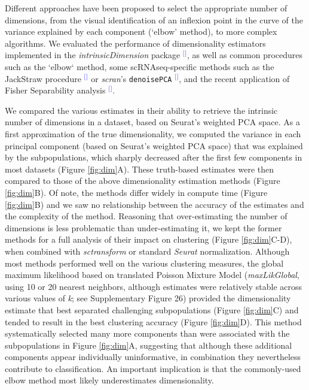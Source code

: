\documentclass[11pt]{article}
\renewcommand{\cite}[1]{\textcolor{Blue}{$^[$\supercite{#1}$^]$}}
\begin{document}
Different approaches have been proposed to select the appropriate number of dimensions, from the visual identification of an {\color{red}inflexion point in the curve of the variance explained by each component (`elbow' method), to more complex algorithms.} We evaluated the performance of dimensionality estimators implemented in the \textit{intrinsicDimension} package \cite{johnssonDimensionality2015}, as well as common procedures such as the `elbow` method, some scRNAseq-specific methods such as the JackStraw procedure \cite{ChungJackstraw2015} or \textit{scran}'s \texttt{denoisePCA} \cite{LunScran2016}, and the recent application of Fisher Separability analysis \cite{AlberganteSepar2019}.

{\color{red}We compared the various estimates in their ability to retrieve the intrinsic number of dimensions in a dataset, based on Seurat's weighted PCA space. As a first approximation of the true dimensionality, we computed the variance in each principal component (based on Seurat's weighted PCA space) that was explained by the subpopulations, which sharply decreased after the first few components in most datasets (Figure \ref{fig:dim}A). These truth-based estimates were then compared to those of the above dimensionality estimation methods (Figure \ref{fig:dim}B).} Of note, the methods differ widely in compute time (Figure \ref{fig:dim}B) and we saw no relationship between the accuracy of the estimates and the complexity of the method. Reasoning that over-estimating the number of dimensions is less problematic than under-estimating it, we kept the former methods for a full analysis of their impact on clustering (Figure \ref{fig:dim}C-D), when combined with \textit{sctransform} or standard \textit{Seurat} normalization. Although most methods performed well on the various clustering measures, the global maximum likelihood based on translated Poisson Mixture Model {\color{red}(\textit{maxLikGlobal}, using 10 or 20 nearest neighbors, although estimates were relatively stable across various values of \textit{k}; see Supplementary Figure 26) provided the dimensionality estimate that best separated challenging subpopulations (Figure \ref{fig:dim}C) and tended to result in the best clustering accuracy (Figure \ref{fig:dim}D). This method systematically selected many more components than were associated with the subpopulations in Figure \ref{fig:dim}A, suggesting that although these additional components appear individually uninformative, in combination they nevertheless contribute to classification. An important implication is that the commonly-used elbow method most likely underestimates dimensionality.}
\end{document}
